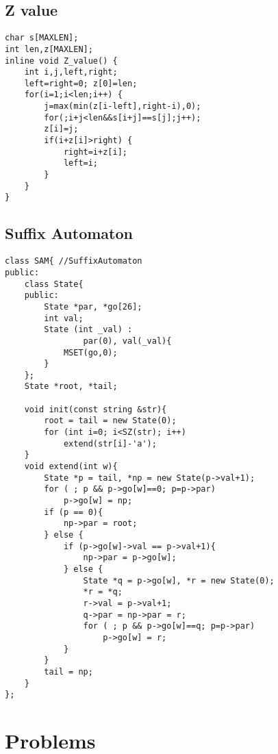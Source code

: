 \documentclass[10pt,twocolumn,oneside]{article}
\begin{document}
\subsection{Z value}
\begin{lstlisting}
char s[MAXLEN];
int len,z[MAXLEN];
inline void Z_value() {
	int i,j,left,right;
	left=right=0; z[0]=len;
	for(i=1;i<len;i++) {
		j=max(min(z[i-left],right-i),0);
		for(;i+j<len&&s[i+j]==s[j];j++);
		z[i]=j;
		if(i+z[i]>right) {
			right=i+z[i];
			left=i;
		}
	}
}
\end{lstlisting}
\subsection{Suffix Automaton}
\begin{lstlisting}
class SAM{ //SuffixAutomaton
public:
	class State{
	public:
		State *par, *go[26];
		int val;
		State (int _val) : 
				par(0), val(_val){
			MSET(go,0);
		}
	};
	State *root, *tail;
	
	void init(const string &str){
		root = tail = new State(0);
		for (int i=0; i<SZ(str); i++)
			extend(str[i]-'a');
	}
	void extend(int w){
		State *p = tail, *np = new State(p->val+1);
		for ( ; p && p->go[w]==0; p=p->par)
			p->go[w] = np;
		if (p == 0){
			np->par = root;
		} else {
			if (p->go[w]->val == p->val+1){
				np->par = p->go[w];
			} else {
				State *q = p->go[w], *r = new State(0);
				*r = *q;
				r->val = p->val+1;
				q->par = np->par = r;
				for ( ; p && p->go[w]==q; p=p->par)
					p->go[w] = r;
			}
		}
		tail = np;
	}
};
\end{lstlisting}
\newpage
\section{Problems}
\end{document}
